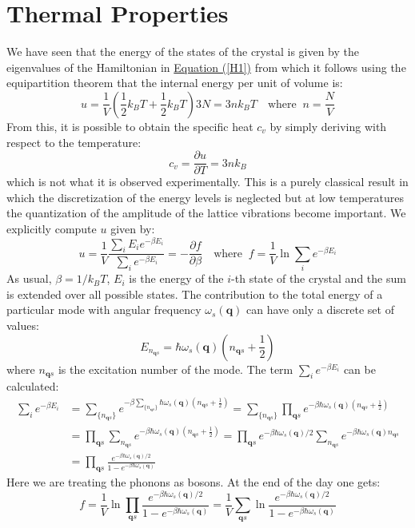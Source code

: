 \documentclass[10.75pt,a4paper,openright,bottom=2cm]{article}
\renewcommand{\Vec}[1]{\boldsymbol{#1}}
\begin{document}
\section{Thermal Properties}
We have seen that the energy of the states of the crystal is given by the eigenvalues of the Hamiltonian in \hyperref[H1]{Equation (\ref{H1})} from which it follows using the equipartition theorem that the internal energy per unit of volume is:
\[
u=\frac{1}{V}\left(\frac{1}{2}k_BT+\frac{1}{2}k_BT\right)3N=3nk_BT \quad \text{where}\;\;n=\frac{N}{V}
\]
From this, it is possible to obtain the specific heat $c_v$ by simply deriving with respect to the temperature:
\[
c_v=\frac{\partial u}{\partial T}=3nk_B
\]
which is not what it is observed experimentally. This is a purely classical result in which the discretization of the energy levels is neglected but at low temperatures the quantization of the amplitude of the lattice vibrations become important. We explicitly compute $u$ given by:
\[
u=\frac{1}{V}\frac{\sum_iE_ie^{-\beta E_i}}{\sum_ie^{-\beta E_i}}=-\frac{\partial f}{\partial\beta} \quad \text{where}\;\;f=\frac{1}{V}\ln{\sum_ie^{-\beta E_i}}
\]
As usual, $\beta=1/k_BT$, $E_i$ is the energy of the $i$-th state of the crystal and the sum is extended over all possible states. The contribution to the total energy of a particular mode with angular frequency $\omega_s(\Vec{q})$ can have only a discrete set of values:
\[
E_{n_{\Vec{q}s}}=\hbar\omega_s(\Vec{q})\left(n_{\Vec{q}s}+\frac{1}{2}\right)
\]
where $n_{\Vec{q}s}$ is the excitation number of the mode. The term $\sum_ie^{-\beta E_i}$ can be calculated:
\begin{align*}
\sum_ie^{-\beta E_i}&=\sum_{\{n_{\Vec{q}s}\}}e^{-\beta\sum_{\{n_{\Vec{q}s}\}}\hbar\omega_s(\Vec{q})\left(n_{\Vec{q}s}+\frac{1}{2}\right)}=\sum_{\{n_{\Vec{q}s}\}}\prod_{\Vec{q}s}e^{-\beta\hbar\omega_s(\Vec{q})\left(n_{\Vec{q}s}+\frac{1}{2}\right)}\\
&=\prod_{\Vec{q}s}\sum_{n_{\Vec{q}s}}e^{-\beta\hbar\omega_s(\Vec{q})\left(n_{\Vec{q}s}+\frac{1}{2}\right)}=\prod_{\Vec{q}s}e^{-\beta\hbar\omega_s(\Vec{q})/2}\sum_{n_{\Vec{q}s}}e^{-\beta\hbar\omega_s(\Vec{q})n_{\Vec{q}s}}\\
&=\prod_{\Vec{q}s}\frac{e^{-\beta\hbar\omega_s(\Vec{q})/2}}{1-e^{-\beta\hbar\omega_s(\Vec{q})}}
\end{align*}
Here we are treating the phonons as bosons. At the end of the day one gets:
\[
f=\frac{1}{V}\ln{\prod_{\Vec{q}s}\frac{e^{-\beta\hbar\omega_s(\Vec{q})/2}}{1-e^{-\beta\hbar\omega_s(\Vec{q})}}}=\frac{1}{V}\sum_{\Vec{q}s}\ln{\frac{e^{-\beta\hbar\omega_s(\Vec{q})/2}}{1-e^{-\beta\hbar\omega_s(\Vec{q})}}}
\]
\end{document}
